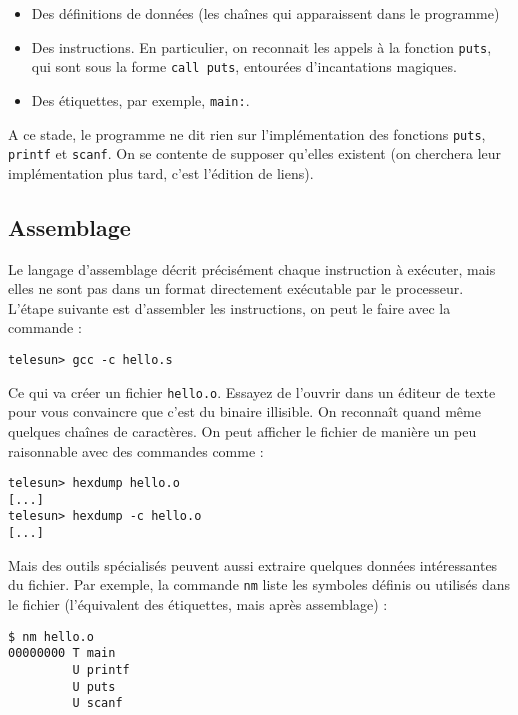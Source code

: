 \documentclass[11pt]{article}
\begin{document}
\begin{itemize}
\item Des définitions de données (les chaînes qui apparaissent dans le
  programme)
\item Des instructions. En particulier, on reconnait les appels à la
  fonction \texttt{puts}, qui sont sous la forme \texttt{call puts},
  entourées d'incantations magiques.
\item Des étiquettes, par exemple, \verb|main:|.
\end{itemize}

A ce stade, le programme ne dit rien sur l'implémentation des
fonctions \texttt{puts}, \texttt{printf} et \texttt{scanf}. On se
contente de supposer qu'elles existent (on cherchera leur
implémentation plus tard, c'est l'édition de liens).

\subsection{Assemblage}

Le langage d'assemblage décrit précisément chaque instruction à
exécuter, mais elles ne sont pas dans un format directement exécutable
par le processeur. L'étape suivante est d'assembler les instructions,
on peut le faire avec la commande :

\begin{verbatim}
telesun> gcc -c hello.s
\end{verbatim}

Ce qui va créer un fichier \texttt{hello.o}. Essayez de l'ouvrir dans
un éditeur de texte pour vous convaincre que c'est du binaire
illisible. On reconnaît quand même quelques chaînes de caractères. On
peut afficher le fichier de manière un peu raisonnable avec des
commandes comme :

\begin{verbatim}
telesun> hexdump hello.o
[...]
telesun> hexdump -c hello.o
[...]
\end{verbatim}

Mais des outils spécialisés peuvent aussi extraire quelques données
intéressantes du fichier. Par exemple, la commande \texttt{nm} liste
les symboles définis ou utilisés dans le fichier (l'équivalent des
étiquettes, mais après assemblage) :

\begin{verbatim}
$ nm hello.o
00000000 T main
         U printf
         U puts
         U scanf
\end{verbatim}
\end{document}

